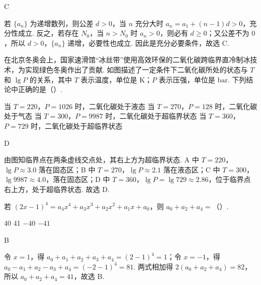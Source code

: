 \begin{answer}
C
\end{answer}

\begin{solution}
若 \(\{a_n\}\) 为递增数列，则公差 \(d>0\)，当 \(n\) 充分大时 \(a_n=a_1+(n-1)d>0\)，充分性成立. 反之，若存在 \(N_0\)，当 \(n>N_0\) 时 \(a_n>0\)，则必有 \(d\ge0\)；又公差不为 \(0\)，所以 \(d>0\)，\(\{a_n\}\) 递增，必要性也成立. 因此是充分必要条件，故选 C.
\end{solution}

\begin{problem}
在北京冬奥会上，国家速滑馆“冰丝带”使用高效环保的二氧化碳跨临界直冷制冰技术，为实现绿色冬奥作出了贡献. 如图描述了一定条件下二氧化碳所处的状态与 \(T\) 和 \(\lg P\) 的关系，其中 \(T\) 表示温度，单位是 \(\mathrm{K}\)；\(P\) 表示压强，单位是 \(\mathrm{bar}\). 下列结论中正确的是（\quad）.

\begin{center}
\end{center}

\choices
    {当 \(T=220\)，\(P=1026\) 时，二氧化碳处于液态}
    {当 \(T=270\)，\(P=128\) 时，二氧化碳处于气态}
    {当 \(T=300\)，\(P=9987\) 时，二氧化碳处于超临界状态}
    {当 \(T=360\)，\(P=729\) 时，二氧化碳处于超临界状态}
\end{problem}

\begin{answer}
D
\end{answer}

\begin{solution}
由图知临界点在两条虚线交点处，其右上方为超临界状态. A 中 \(T=220\)，\(\lg P\approx3.0\) 落在固态区；B 中 \(T=270\)，\(\lg P\approx2.1\) 落在液态区；C 中 \(T=300\)，\(\lg9987\approx4.0\)，落在固态区；D 中 \(T=360\)，\(\lg P=\lg729\approx2.86\)，位于临界点右上方，处于超临界状态. 故选 D.
\end{solution}

\begin{problem}
若 \((2x-1)^4=a_4x^4+a_3x^3+a_2x^2+a_1x+a_0\)，则 \(a_0+a_2+a_4=\)（\quad）.

\choices
    {40}
    {41}
    {\(-40\)}
    {\(-41\)}
\end{problem}

\begin{answer}
B
\end{answer}

\begin{solution}
令 \(x=1\)，得 \(a_0+a_1+a_2+a_3+a_4=(2-1)^4=1\)；令 \(x=-1\)，得 \(a_0-a_1+a_2-a_3+a_4=(-2-1)^4=81\). 两式相加得 \(2(a_0+a_2+a_4)=82\)，所以 \(a_0+a_2+a_4=41\)，故选 B.
\end{solution}

